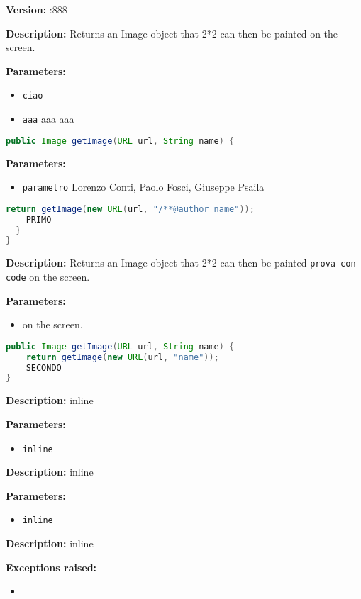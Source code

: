 \textbf{Version:} :888

\textbf{Description:}
Returns an Image object that 2*2 can then be painted on the screen.

\textbf{Parameters:}
\begin{itemize}
  \item\texttt{ciao} 
  \item\texttt{aaa} aaa aaa
\end{itemize}

\begin{lstlisting}[language=Java]
public Image getImage(URL url, String name) {
\end{lstlisting}
\textbf{Parameters:}
\begin{itemize}
  \item\texttt{parametro} Lorenzo Conti, Paolo Fosci, Giuseppe Psaila
\end{itemize}

\begin{lstlisting}[language=Java]
    return getImage(new URL(url, "/**@author name"));
    PRIMO
  }
}
\end{lstlisting}
\textbf{Description:}
Returns an Image object that 2*2 can then be painted \texttt{prova con code} on the screen.

\textbf{Parameters:}
\begin{itemize}
  \item\texttt{} on the screen.
\end{itemize}

\begin{lstlisting}[language=Java]
public Image getImage(URL url, String name) {
    return getImage(new URL(url, "name"));
    SECONDO
}
\end{lstlisting}
\textbf{Description:}
inline

\textbf{Parameters:}
\begin{itemize}
  \item\texttt{inline} 
\end{itemize}

\textbf{Description:}
inline

\textbf{Parameters:}
\begin{itemize}
  \item\texttt{inline} 
\end{itemize}

\textbf{Description:}
inline

\textbf{Exceptions raised:}
\begin{itemize}
  \item\texttt{} 
\end{itemize}

